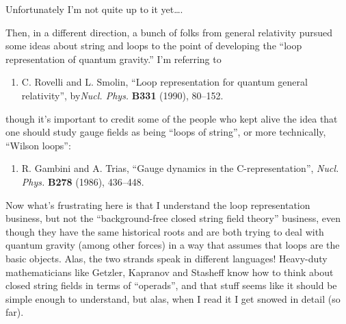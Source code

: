 \documentclass[12pt]{article}
\def\tightlist{}
\renewcommand{\texttt}[1]{%
  \begingroup
  \ttfamily
  \begingroup\lccode`~=`/\lowercase{\endgroup\def~}{/\discretionary{}{}{}}%
  \begingroup\lccode`~=`[\lowercase{\endgroup\def~}{[\discretionary{}{}{}}%
  \begingroup\lccode`~=`.\lowercase{\endgroup\def~}{.\discretionary{}{}{}}%
  \catcode`/=\active\catcode`[=\active\catcode`.=\active
  \scantokens{#1\noexpand}%
  \endgroup
}
\begin{document}
\noindent
Unfortunately I'm not quite up to it yet\ldots.

Then, in a different direction, a bunch of folks from general relativity
pursued some ideas about string and loops to the point of developing the
``loop representation of quantum gravity.'' I'm referring to

\begin{enumerate}
\def\labelenumi{\arabic{enumi})}
\setcounter{enumi}{4}
\tightlist
\item
  C. Rovelli and L. Smolin,  ``Loop representation for quantum general relativity'', by\emph{Nucl. Phys.} \textbf{B331} (1990), 80--152.
\end{enumerate}
\noindent
though it's important to credit some of the people who kept alive the
idea that one should study gauge fields as being ``loops of string'', or
more technically, ``Wilson loops'':

\begin{enumerate}
\def\labelenumi{\arabic{enumi})}
\setcounter{enumi}{5}
\tightlist
\item
  R. Gambini and A. Trias, ``Gauge dynamics in the C-representation'', \emph{Nucl. Phys.} \textbf{B278} (1986),
   436--448.
\end{enumerate}

Now what's frustrating here is that I understand the loop representation
business, but not the ``background-free closed string field theory''
business, even though they have the same historical roots and are both
trying to deal with quantum gravity (among other forces) in a way that
assumes that loops are the basic objects. Alas, the two strands speak in
different languages! Heavy-duty mathematicians like Getzler, Kapranov
and Stasheff know how to think about closed string fields in terms of
``operads'', and that stuff seems like it should be simple enough to
understand, but alas, when I read it I get snowed in detail (so far).
\end{document}
